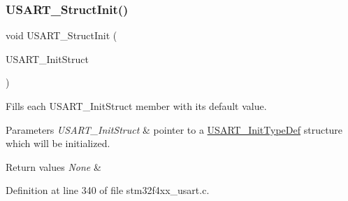 \subsubsection{\texorpdfstring{U\+S\+A\+R\+T\+\_\+\+Struct\+Init()}{USART\_StructInit()}}
{\footnotesize\ttfamily void U\+S\+A\+R\+T\+\_\+\+Struct\+Init (\begin{DoxyParamCaption}\item[{\hyperlink{struct_u_s_a_r_t___init_type_def}{U\+S\+A\+R\+T\+\_\+\+Init\+Type\+Def} $\ast$}]{U\+S\+A\+R\+T\+\_\+\+Init\+Struct }\end{DoxyParamCaption})}



Fills each U\+S\+A\+R\+T\+\_\+\+Init\+Struct member with its default value. 


\begin{DoxyParams}{Parameters}
{\em U\+S\+A\+R\+T\+\_\+\+Init\+Struct} & pointer to a \hyperlink{struct_u_s_a_r_t___init_type_def}{U\+S\+A\+R\+T\+\_\+\+Init\+Type\+Def} structure which will be initialized. \\
\hline
\end{DoxyParams}

\begin{DoxyRetVals}{Return values}
{\em None} & \\
\hline
\end{DoxyRetVals}


Definition at line 340 of file stm32f4xx\+\_\+usart.\+c.

